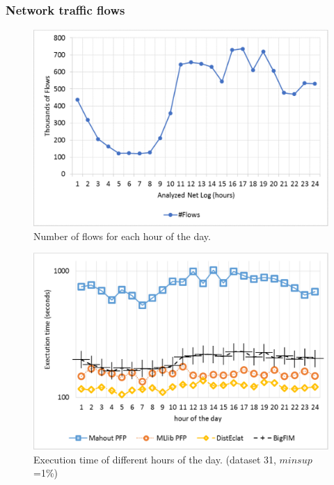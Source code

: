 \subsubsection{Network traffic flows}
\label{net_exp}


\begin{figure}[!t]
\includegraphics[width=5in]{number_flows.eps}
\caption{Number of flows for each hour of the day.}
\label{number_flows}
\end{figure}

\begin{figure}[!t]
\includegraphics[width=5in]{net_logs_log.eps}
\caption{Execution time of different hours of the day.
(dataset 31, $minsup$=1\%)}
\label{net}
\end{figure}


